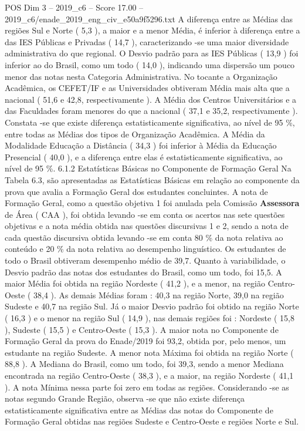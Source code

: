 \begin{textsample}{POS Dim 3 – 2019\_c6 – Score 17.00 – 2019\_c6/enade\_2019\_eng\_civ\_e50a9f5296.txt}
A diferença entre as Médias das regiões Sul e Norte ( 5,3 ), a maior e a menor Média, é inferior à diferença entre a das IES Públicas e Privadas ( 14,7 ), caracterizando -se uma maior diversidade administrativa do que regional.
O Desvio padrão para as IES Públicas ( 13,9 ) foi inferior ao do Brasil, como um todo ( 14,0 ), indicando uma dispersão um pouco menor das notas nesta Categoria Administrativa.
No tocante a Organização Acadêmica, os CEFET/IF e as Universidades obtiveram Média mais alta que a nacional ( 51,6 e 42,8, respectivamente ).
A Média dos Centros Universitários e a das Faculdades foram menores do que a nacional ( 37,1 e 35,2, respectivamente ).
Constata -se que existe diferença estatisticamente significativa, ao nível de 95 \%, entre todas as Médias dos tipos de Organização Acadêmica.
A Média da Modalidade Educação a Distância ( 34,3 ) foi inferior à Média da Educação Presencial ( 40,0 ), e a diferença entre elas é estatisticamente significativa, ao nível de 95 \%. 6.1.2 Estatísticas Básicas no Componente de Formação Geral Na Tabela 6.3, são apresentadas as Estatísticas Básicas em relação ao componente da prova que avalia a Formação Geral dos estudantes concluintes.
A nota de Formação Geral, como a questão objetiva 1 foi anulada pela Comissão \textbf{Assessora} de Área ( CAA ), foi obtida levando -se em conta os acertos nas sete questões objetivas e a nota média obtida nas questões discursivas 1 e 2, sendo a nota de cada questão discursiva obtida levando -se em conta 80 \% da nota relativa ao conteúdo e 20 \% da nota relativa ao desempenho linguístico.
Os estudantes de todo o Brasil obtiveram desempenho médio de 39,7.
Quanto à variabilidade, o Desvio padrão das notas dos estudantes do Brasil, como um todo, foi 15,5.
A maior Média foi obtida na região Nordeste ( 41,2 ), e a menor, na região Centro-Oeste ( 38,4 ).
As demais Médias foram : 40,3 na região Norte, 39,0 na região Sudeste e 40,7 na região Sul.
Já o maior Desvio padrão foi obtido na região Norte ( 16,3 ) e o menor na região Sul ( 14,9 ), nas demais regiões foi : Nordeste ( 15,8 ), Sudeste ( 15,5 ) e Centro-Oeste ( 15,3 ).
A maior nota no Componente de Formação Geral da prova do Enade/2019 foi 93,2, obtida por, pelo menos, um estudante na região Sudeste.
A menor nota Máxima foi obtida na região Norte ( 88,8 ).
A Mediana do Brasil, como um todo, foi 39,3, sendo a menor Mediana encontrada na região Centro-Oeste ( 38,3 ), e a maior, na região Nordeste ( 41,1 ).
A nota Mínima nessa parte foi zero em todas as regiões.
Considerando -se as notas segundo Grande Região, observa -se que não existe diferença estatisticamente significativa entre as Médias das notas do Componente de Formação Geral obtidas nas regiões Sudeste e Centro-Oeste e regiões Norte e Sul.

\end{textsample}
